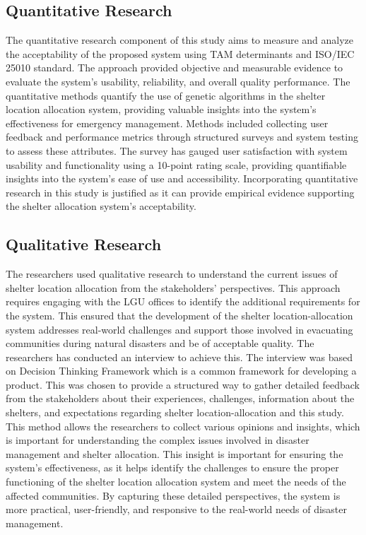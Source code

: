 \subsection{Quantitative Research}
	The quantitative research component of this study aims to measure and analyze the acceptability of the proposed system using TAM determinants and ISO/IEC 25010 standard. The approach provided objective and measurable evidence to evaluate the system's usability, reliability, and overall quality performance. The quantitative methods quantify the use of genetic algorithms in the shelter location allocation system, providing valuable insights into the system's effectiveness for emergency management.
	Methods included collecting user feedback and performance metrics through structured surveys and system testing to assess these attributes. The survey has gauged user satisfaction with system usability and functionality using a 10-point rating scale, providing quantifiable insights into the system's ease of use and accessibility. 
	Incorporating quantitative research in this study is justified as it can provide empirical evidence supporting the shelter allocation system's acceptability. 

\subsection{Qualitative Research}
	The researchers used qualitative research to understand the current issues of shelter location allocation from the stakeholders' perspectives. This approach requires engaging with the LGU offices to identify the additional requirements for the system. This ensured that the development of the shelter location-allocation system addresses real-world challenges and support those involved in evacuating communities during natural disasters and be of acceptable quality.
	The researchers has conducted an interview to achieve this. The interview was based on Decision Thinking Framework which is a common framework for developing a product. This was chosen to provide a structured way to gather detailed feedback from the stakeholders about their experiences, challenges, information about the shelters, and expectations regarding shelter location-allocation and this study. This method allows the researchers to collect various opinions and insights, which is important for understanding the complex issues involved in disaster management and shelter allocation.
	This insight is important for ensuring the system's effectiveness, as it helps identify the challenges to ensure the proper functioning of the shelter location allocation system and meet the needs of the affected communities. By capturing these detailed perspectives, the system is more practical, user-friendly, and responsive to the real-world needs of disaster management.


